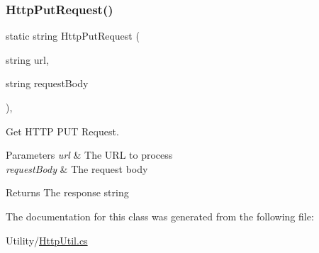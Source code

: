 \subsubsection{\texorpdfstring{Http\+Put\+Request()}{HttpPutRequest()}}
{\footnotesize\ttfamily static string Http\+Put\+Request (\begin{DoxyParamCaption}\item[{string}]{url,  }\item[{string}]{request\+Body }\end{DoxyParamCaption})\hspace{0.3cm}{\ttfamily [inline]}, {\ttfamily [static]}}



Get H\+T\+TP P\+UT Request. 


\begin{DoxyParams}{Parameters}
{\em url} & The U\+RL to process\\
\hline
{\em request\+Body} & The request body\\
\hline
\end{DoxyParams}
\begin{DoxyReturn}{Returns}
The response string
\end{DoxyReturn}


The documentation for this class was generated from the following file\+:\begin{DoxyCompactItemize}
\item 
Utility/\hyperlink{HttpUtil_8cs}{Http\+Util.\+cs}\end{DoxyCompactItemize}
